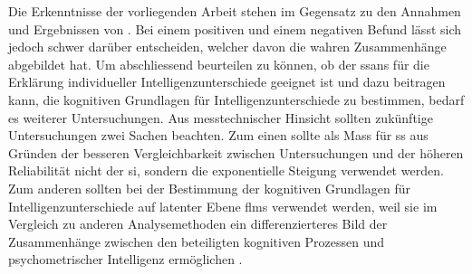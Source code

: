 \documentclass[11pt, twoside, a4paper]{book}		%
\begin{document}
Die Erkenntnisse der vorliegenden Arbeit stehen im Gegensatz zu den Annahmen und Ergebnissen von \citet{Melnick2013}. 
Bei einem positiven und einem negativen Befund lässt sich jedoch schwer darüber entscheiden, welcher davon die wahren Zusammenhänge abgebildet hat. 
Um abschliessend beurteilen zu können, ob der \gls{ssans} \citep{Melnick2013} für die Erklärung individueller Intelligenzunterschiede geeignet ist und dazu beitragen kann, die kognitiven Grundlagen für Intelligenzunterschiede zu bestimmen, bedarf es weiterer Untersuchungen.
Aus messtechnischer Hinsicht sollten zukünftige Untersuchungen zwei Sachen beachten. Zum einen sollte als Mass für \gls{ss} aus Gründen der besseren Vergleichbarkeit zwischen Untersuchungen und der höheren Reliabilität nicht der \gls{si}, sondern die exponentielle Steigung verwendet werden. 
Zum anderen sollten bei der Bestimmung der kognitiven Grundlagen für Intelligenzunterschiede auf latenter Ebene \glspl{flm} \citep[z.~B.][]{Schweizer2006a, Schweizer2006b, Schweizer2007, Schweizer2008, Schweizer2009a} verwendet werden, weil sie im Vergleich zu anderen Analysemethoden ein differenzierteres Bild der Zusammenhänge zwischen den beteiligten kognitiven Prozessen und psychometrischer Intelligenz ermöglichen \citep[siehe][]{Ren2013, Schweizer2007, Stankov2007, Wang2015}.


\cleardoublepage								%
\renewcommand\bibname{Literatur}				%

\end{document}
